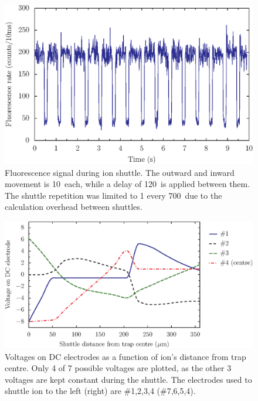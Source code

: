 \begin{figure}[h!t]
\centering
\includegraphics{chapter7/shuttle/longshuttle_v1}
\caption[Fluorescence during ion shuttle]{Fluorescence signal during ion shuttle. The outward and inward movement is 10\ms\, each, while a delay of 120\ms\, is applied between them. The shuttle repetition was limited to 1 every 700\ms\, due to the calculation overhead between shuttles.}
\label{fig:longshuttle}
\end{figure} 

\begin{figure}[h!t]
\centering
\includegraphics[width=14.5cm]{chapter7/waveform/rtusual/shuttlewaveform_v1}
\caption[DC electrode voltages for shuttle]{Voltages on DC electrodes as a function of ion's distance from trap centre. Only 4 of 7 possible voltages are plotted, as the other 3 voltages are kept constant during the shuttle. The electrodes used to shuttle ion to the left (right) are \#1,2,3,4  (\#7,6,5,4). }
\label{fig:shuttlevolts}
\end{figure} 




